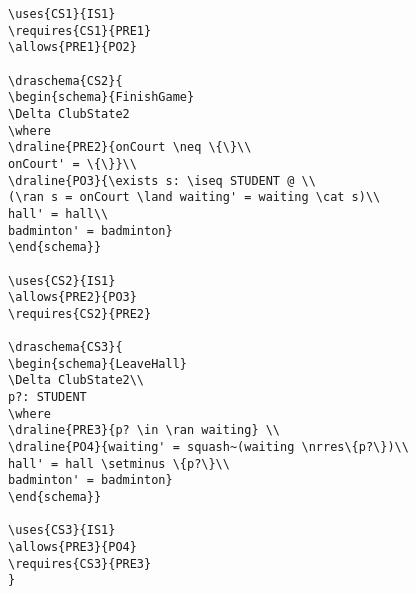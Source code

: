 \begin{verbatim}
\uses{CS1}{IS1}
\requires{CS1}{PRE1}
\allows{PRE1}{PO2}

\draschema{CS2}{
\begin{schema}{FinishGame}
\Delta ClubState2
\where
\draline{PRE2}{onCourt \neq \{\}\\
onCourt' = \{\}}\\
\draline{PO3}{\exists s: \iseq STUDENT @ \\
(\ran s = onCourt \land waiting' = waiting \cat s)\\
hall' = hall\\
badminton' = badminton}
\end{schema}}

\uses{CS2}{IS1}
\allows{PRE2}{PO3}
\requires{CS2}{PRE2}

\draschema{CS3}{
\begin{schema}{LeaveHall}
\Delta ClubState2\\
p?: STUDENT
\where
\draline{PRE3}{p? \in \ran waiting} \\
\draline{PO4}{waiting' = squash~(waiting \nrres\{p?\})\\
hall' = hall \setminus \{p?\}\\
badminton' = badminton}
\end{schema}}

\uses{CS3}{IS1}
\allows{PRE3}{PO4}
\requires{CS3}{PRE3}
}


\end{verbatim}